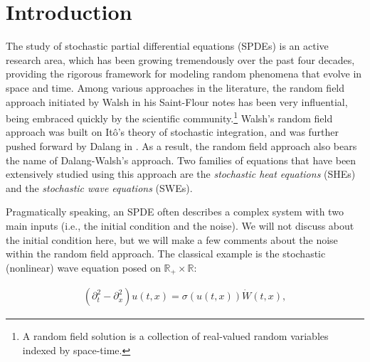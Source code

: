 \documentclass[letterpaper, 11pt,  reqno]{amsart}
\newcommand{\noi}{\noindent}
\newcommand{\R}{\mathbb{R}}
\newcommand{\s}{\sigma}
\newcommand{\dx}{\partial_x}
\newcommand{\dt}{\partial_t}
\numberwithin{equation}{section}
\numberwithin{theorem}{section}
\begin{document}
 

\section{Introduction}

 


 

The study of stochastic partial differential equations (SPDEs)
  is an active research area,
which has been growing tremendously over the past four decades, 
providing the rigorous framework for modeling random phenomena
 that evolve in space and time. 
Among various approaches  in the literature,
 the random field approach initiated by Walsh in his Saint-Flour notes \cite{walsh86} 
 has been very influential, being embraced quickly by the scientific community.\footnote{A 
 random field  solution is a collection
of real-valued random variables indexed by space-time.} 
 Walsh's random field approach was built on It\^o's theory of stochastic integration, 
 and was further pushed forward by Dalang in \cite{dalang99}. As a result, 
 the random field approach also bears the name of Dalang-Walsh's approach. 
Two families of  equations that have been extensively studied using this approach are
   the {\em stochastic heat equations} (SHEs) and  the {\em stochastic wave equations} 
(SWEs). 



Pragmatically speaking,  
an SPDE often describes a complex system with two main  inputs 
(i.e., the initial condition  and the noise).  
We will not discuss about the initial condition here, 
but we will make a few comments about the noise within the random field approach. 
The classical example is the stochastic (nonlinear) wave equation posed on 
$\R_+\times\R$:

\noi
\begin{align}
(\dt^2 - \dx^2) u(t,x) = \s(u (t,x)) \dot{W}(t,x), \label{gSWE}
\end{align}
\end{document}
